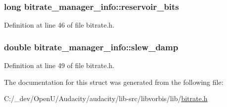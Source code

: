 \subsubsection[{\texorpdfstring{reservoir\+\_\+bits}{reservoir_bits}}]{\setlength{\rightskip}{0pt plus 5cm}long bitrate\+\_\+manager\+\_\+info\+::reservoir\+\_\+bits}\hypertarget{structbitrate__manager__info_ac3474e0e648e661ac5e4b0d8a434fa32}{}\label{structbitrate__manager__info_ac3474e0e648e661ac5e4b0d8a434fa32}


Definition at line 46 of file bitrate.\+h.

\subsubsection[{\texorpdfstring{slew\+\_\+damp}{slew_damp}}]{\setlength{\rightskip}{0pt plus 5cm}double bitrate\+\_\+manager\+\_\+info\+::slew\+\_\+damp}\hypertarget{structbitrate__manager__info_a8b2831842978c4a426f63241ec17d030}{}\label{structbitrate__manager__info_a8b2831842978c4a426f63241ec17d030}


Definition at line 49 of file bitrate.\+h.



The documentation for this struct was generated from the following file\+:\begin{DoxyCompactItemize}
\item 
C\+:/\+\_\+dev/\+Open\+U/\+Audacity/audacity/lib-\/src/libvorbis/lib/\hyperlink{bitrate_8h}{bitrate.\+h}\end{DoxyCompactItemize}
